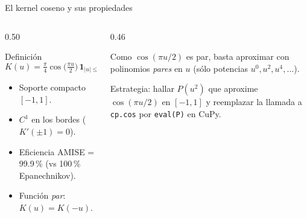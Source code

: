 \documentclass[aspectratio=169,10pt]{beamer}
\begin{document}
\begin{frame}{El kernel coseno y sus propiedades}
  \begin{columns}[T]
    \begin{column}{0.50\textwidth}
      \begin{block}{Definición}
        \footnotesize
        \[
          K(u) = \tfrac{\pi}{4}\cos\!\bigl(\tfrac{\pi u}{2}\bigr)\,
                 \mathbf{1}_{|u|\le 1}
        \]
        \begin{itemize}
          \item Soporte compacto $[-1,1]$.
          \item $C^{1}$ en los bordes ($K'(\pm 1) = 0$).
          \item Eficiencia AMISE = 99.9\,\% (vs 100\,\% Epanechnikov).
          \item Función \emph{par}: $K(u) = K(-u)$.
        \end{itemize}
      \end{block}
    \end{column}
    \begin{column}{0.46\textwidth}
      \begin{tcolorbox}[colback=LBlue, colframe=Blue, fontupper=\footnotesize]
        Como $\cos(\pi u/2)$ es par, basta aproximar con polinomios
        \emph{pares} en $u$ (sólo potencias $u^{0}, u^{2}, u^{4},\dots$).
      \end{tcolorbox}
      \vspace{4pt}
      \begin{tcolorbox}[colback=LGreen, colframe=Green, fontupper=\footnotesize]
        Estrategia: hallar $P(u^{2})$ que aproxime $\cos(\pi u/2)$ en
        $[-1,1]$ y reemplazar la llamada a \texttt{cp.cos} por
        \texttt{eval(P)} en CuPy.
      \end{tcolorbox}
    \end{column}
  \end{columns}
\end{frame}
\end{document}
